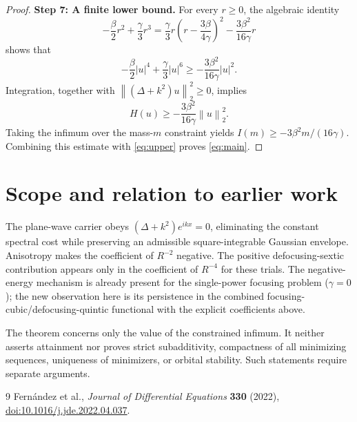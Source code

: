 \documentclass[11pt]{article}
\newcommand{\norm}[1]{\left\lVert #1\right\rVert}
\begin{document}
\begin{proof}
\medskip
\noindent\textbf{Step 7: A finite lower bound.}
For every $r\ge0$, the algebraic identity
\begin{equation}\label{eq:completion}
 -\frac{\beta}{2}r^2+\frac{\gamma}{3}r^3
 =\frac{\gamma}{3}r\left(r-\frac{3\beta}{4\gamma}\right)^2
 -\frac{3\beta^2}{16\gamma}r
\end{equation}
shows that
\begin{equation}\label{eq:pointwise}
 -\frac{\beta}{2}|u|^4+\frac{\gamma}{3}|u|^6
 \ge-\frac{3\beta^2}{16\gamma}|u|^2.
\end{equation}
Integration, together with $\norm{(\Delta+k^2)u}_2^2\ge0$, implies
\begin{equation}\label{eq:lower}
 H(u)\ge-\frac{3\beta^2}{16\gamma}\norm{u}_2^2.
\end{equation}
Taking the infimum over the mass-$m$ constraint yields
$I(m)\ge-3\beta^2m/(16\gamma)$.
Combining this estimate with \eqref{eq:upper} proves
\eqref{eq:main}.
\end{proof}

\section{Scope and relation to earlier work}
The plane-wave carrier obeys $(\Delta+k^2)e^{ikx}=0$, eliminating
the constant spectral cost while preserving an admissible
square-integrable Gaussian envelope. Anisotropy makes the coefficient
of $R^{-2}$ negative. The positive defocusing-sextic contribution
appears only in the coefficient of $R^{-4}$ for these trials.
The negative-energy mechanism is already present for the
single-power focusing problem ($\gamma=0$); the new observation here
is its persistence in the combined focusing-cubic/defocusing-quintic
functional with the explicit coefficients above.

The theorem concerns only the value of the constrained infimum. It
neither asserts attainment nor proves strict subadditivity, compactness
of all minimizing sequences, uniqueness of minimizers, or orbital
stability. Such statements require separate arguments.

\begin{thebibliography}{9}
Fern\'andez et al., \emph{Journal of Differential Equations}
\textbf{330} (2022),
\href{https://doi.org/10.1016/j.jde.2022.04.037}
{doi:10.1016/j.jde.2022.04.037}.
\end{thebibliography}
\end{document}
